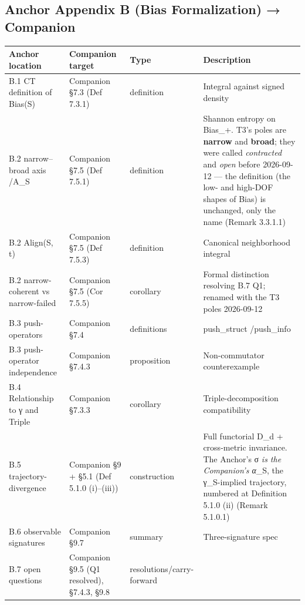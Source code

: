 \documentclass[11pt, openany]{book}
\newcommand{\sectionbreak}{\clearpage}
\begin{document}
\begin{center}
\begin{tabular}{p{0.57in} p{2.18in} p{0.81in} p{0.72in}}
\bottomrule
\end{tabular}
\end{center}
\endgroup
\subsection{Anchor Appendix B (Bias Formalization) → Companion}

\begingroup\setlength{\tabcolsep}{3pt}\renewcommand{\arraystretch}{1.15}\footnotesize
\begin{longtable}{p{0.54in} p{0.54in} p{0.54in} p{2.65in}}
\toprule
Anchor location & Companion target & Type & Description \\
\midrule
\endhead
\bottomrule
\endfoot
B.1 CT definition of Bias(S) & Companion §7.3 (Def 7.3.1) & definition & Integral against signed density \\
\midrule
B.2 narrow–broad axis /\allowbreak  A\_\allowbreak{}S & Companion §7.5 (Def 7.5.1) & definition & Shannon entropy on Bias\_\allowbreak{}+. T3's poles are \textbf{narrow} and \textbf{broad}; they were called \textit{contracted} and \textit{open} before 2026-09-12 --- the definition (the low- and high-DOF shapes of Bias) is unchanged, only the name (Remark 3.3.1.1) \\
\midrule
B.2 Align(S, t) & Companion §7.5 (Def 7.5.3) & definition & Canonical neighborhood integral \\
\midrule
B.2 narrow-coherent vs narrow-failed & Companion §7.5 (Cor 7.5.5) & corollary & Formal distinction resolving B.7 Q1; renamed with the T3 poles 2026-09-12 \\
\midrule
B.3 push-operators & Companion §7.4 & definitions & push\_\allowbreak{}struct /\allowbreak  push\_\allowbreak{}info \\
\midrule
B.3 push-operator independence & Companion §7.4.3 & proposition & Non-commutator counterexample \\
\midrule
B.4 Relationship to γ and Triple & Companion §7.3.3 & corollary & Triple-decomposition compatibility \\
\midrule
B.5 trajectory-divergence & Companion §9 + §5.1 (Def 5.1.0 (i)–(iii)) & construction & Full functorial D\_\allowbreak{}d + cross-metric invariance. The Anchor's σ\textit{ is the Companion's α}\_\allowbreak{}S, the γ\_\allowbreak{}S-implied trajectory, numbered at Definition 5.1.0 (ii) (Remark 5.1.0.1) \\
\midrule
B.6 observable signatures & Companion §9.7 & summary & Three-signature spec \\
\midrule
B.7 open questions & Companion §9.5 (Q1 resolved), §7.4.3, §9.8 & resolutions/\allowbreak carry-forward &  \\
\bottomrule
\end{longtable}
\endgroup
\sectionbreak
\end{document}

